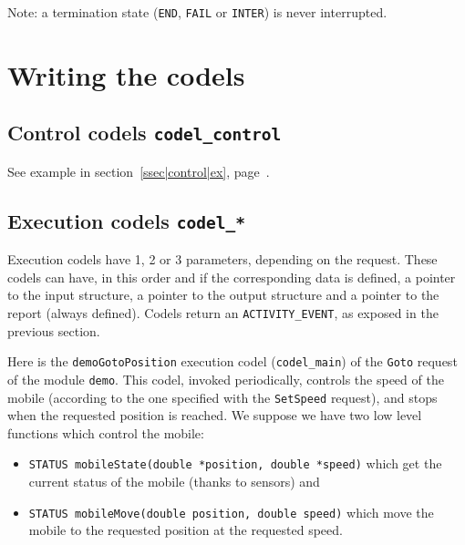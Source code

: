 Note: a termination state ({\tt END}, {\tt FAIL} or {\tt INTER}) is never
interrupted.



\section{Writing the codels}
\label{sec|codels|writing}


\subsection{Control codels  {\tt codel\_control}}

See        example            in           section~\ref{ssec|control|ex},
page~\pageref{ssec|control|ex}.

\subsection{Execution codels  {\tt codel\_*}}

Execution  codels have 1,  2 or 3  parameters,  depending on the request.
These codels can have,  in this order and   if the corresponding  data is
defined,  a pointer to  the   input structure,  a pointer  to  the output
structure and a pointer to the report (always  defined). Codels return an
{\tt ACTIVITY\_EVENT}, as exposed in the previous section.

Here is the {\tt demoGotoPosition}  execution codel ({\tt codel\_main})
of the {\tt Goto} request of the module {\tt demo}. This codel,
invoked periodically, controls the speed of the mobile (according to the
one specified with the {\tt SetSpeed} request), and stops when the
requested position is reached. We suppose we have two low level functions
which control the mobile:

\begin{itemize}
\item {\tt STATUS mobileState(double *position, double *speed)} which get
the current status of the mobile (thanks to sensors) and
\item {\tt STATUS mobileMove(double position, double speed)} which move
the mobile to the requested position at the requested speed.
\end{itemize}

